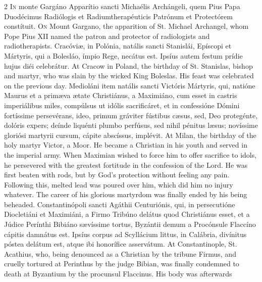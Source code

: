 \begin{paracol}{2}
\lettrine[lines=2]{I}{n} monte Gargáno 
 Apparítio sancti Michaélis Archángeli, quem Pius Papa Duodécimus Radiólogis 
 et Radiumtherapéuticis Patrónum et Protectórem constítuit.
\switchcolumn
{}
\lettrine[lines=2]{O}{n} Mount Gargano, the apparition of 
 St. Michael Archangel, whom Pope Pius XII named the patron and protector of 
 radiologists and radiotherapists.
\switchcolumn*
{}
Cracóviæ, in Polónia, 
 natális sancti Stanislái, Epíscopi et Mártyris, qui a Bolesláo, ímpio Rege, 
 necátus est. Ipsíus autem festum prídie hujus diéi celebrátur.
\switchcolumn
{}
At Cracow in Poland, the birthday 
 of St. Stanislas, bishop and martyr, who was slain by the wicked King 
 Boleslas. His feast was celebrated on the previous day.
\switchcolumn*
{}
Medioláni item natális 
 sancti Victóris Mártyris, qui, natióne Maurus et a primæva ætate Christiánus, 
 a Maximiáno, cum esset in castris imperiálibus miles, compúlsus ut idólis 
 sacrificáret, et in confessióne Dómini fortíssime persevérans, ideo, primum 
 gráviter fústibus cæsus, sed, Deo protegénte, dolóris expers; deínde 
 liquénti plumbo perfúsus, sed nihil pénitus læsus; novíssime gloriósi 
 martyrii cursum, cápite abscíssus, implévit.
\switchcolumn
{}
At Milan, the birthday of the holy 
 martyr Victor, a Moor. He became a Christian in his youth and served 
 in the imperial army. When Maximian wished to force him to offer 
 sacrifice to idols, he persevered with the greatest fortitude in the 
 confession of the Lord. He was first beaten with rods, but by God's 
 protection without feeling any pain. Following this, melted lead was 
 poured over him, which did him no injury whatever. The career of his 
 glorious martyrdom was finally ended by his being beheaded.
\switchcolumn*
{}
Constantinópoli sancti 
 Agáthii Centuriónis, qui, in persecutióne Diocletiáni et Maximiáni, a Firmo 
 Tribúno delátus quod Christiánus esset, et a Júdice Perínthi Bibiáno 
 sævíssime tortus, Byzántii demum a Procónsule Flaccíno cápitis damnátus est. 
 Ipsíus corpus ad Scyllácium littus, in Calábria, divínitus póstea delátum 
 est, atque ibi honorífice asservátum.
\switchcolumn
{}
At Constantinople, St. Acathius, 
 who, being denounced as a Christian by the tribune Firmus, and cruelly 
 tortured at Perinthus by the judge Bibian, was finally condemned to death at 
 Byzantium by the procunsul Flaccinus. His body was afterwards 

\end{paracol}
